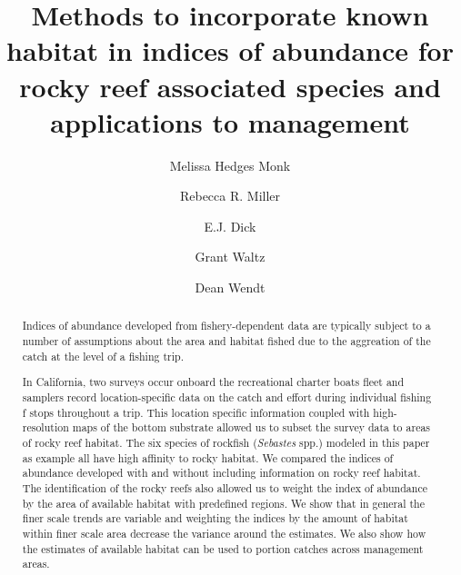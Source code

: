 \documentclass[
  12pt,
  authoryear,
  preprint,
  3p]{elsarticle}
\begin{document}
\begin{frontmatter}
\title{Methods to incorporate known habitat in indices of abundance for
rocky reef associated species and applications to management}
\author[1]{Melissa Hedges Monk%
%
}
\author[2]{Rebecca R. Miller%
%
}
\author[1]{E.J. Dick%
%
}
\author[33]{Grant Waltz%
%
}
\author[3]{Dean Wendt%
%
}









        
\begin{abstract}
Indices of abundance developed from fishery-dependent data are typically
subject to a number of assumptions about the area and habitat fished due
to the aggreation of the catch at the level of a fishing trip.

In California, two surveys occur onboard the recreational charter boats
fleet and samplers record location-specific data on the catch and effort
during individual fishing f stops throughout a trip. This location
specific information coupled with high-resolution maps of the bottom
substrate allowed us to subset the survey data to areas of rocky reef
habitat. The six species of rockfish (\emph{Sebastes} spp.) modeled in
this paper as example all have high affinity to rocky habitat. We
compared the indices of abundance developed with and without including
information on rocky reef habitat. The identification of the rocky reefs
also allowed us to weight the index of abundance by the area of
available habitat with predefined regions. We show that in general the
finer scale trends are variable and weighting the indices by the amount
of habitat within finer scale area decrease the variance around the
estimates. We also show how the estimates of available habitat can be
used to portion catches across management areas.
\end{abstract}






\end{frontmatter}
\end{document}

